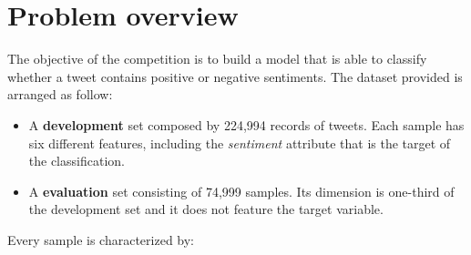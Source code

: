 \documentclass[conference]{IEEEtran}
\begin{document}
\section{Problem overview}\label{sec:overview}
The objective of the competition is to build a model that is able to classify whether a tweet contains positive or negative sentiments. The dataset provided is arranged as follow:
\begin{itemize}
    \item A \textbf{development} set composed by 224,994 records of tweets. Each sample has six different features, including the \textit{sentiment} attribute that is the target of the classification.
    \item A \textbf{evaluation} set consisting of 74,999 samples. Its dimension is one-third of the development set and it does not feature the target variable.
\end{itemize}
Every sample is characterized by:
\end{document}
